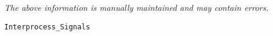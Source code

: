 \label{pkg:interprocess\_signals}

{\tiny \it The above information is manually maintained and may contain errors.}
\begin{verbatim}
Interprocess_Signals
\end{verbatim}
